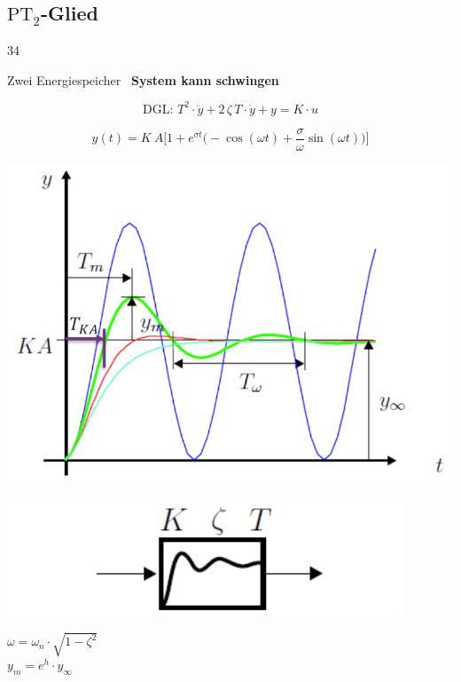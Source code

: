 \subsection[PT2-Glied]{$\text{PT}_2$-Glied}{34}

Zwei Energiespeicher \textrightarrow\ \textbf{System kann schwingen}

\begin{minipage}{0.4\columnwidth}
    $$ \boxed{ \text{DGL: } T^2 \cdot  \ddot{y} + 2 \, \zeta \, T \cdot \dot{y} + y = K \cdot u } $$
\end{minipage}
\hfill
\begin{minipage}{0.58\columnwidth}
    $$ \boxed{ y(t) = K \: A \big[ 1 + e^{\sigma t} \big( - \cos(\omega t) + \frac{\sigma}{\omega} \sin(\omega t)  \big)  \big] }  $$
\end{minipage}


\begin{minipage}{0.55\columnwidth}
    \includegraphics[width=\columnwidth]{images/pT2_sprungantwort}
\end{minipage}
\hfill
\begin{minipage}{0.38\columnwidth}
    \includegraphics[width=0.75\columnwidth]{images/pT2_symbol} 

    \begin{center}
        $ \omega = \omega_n \cdot \sqrt{1 - \zeta^2} $ \\
        $y_m = e^h \cdot y_{\infty}$ \\
    \end{center}
\end{minipage}


